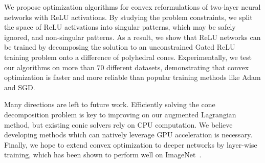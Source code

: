 
We propose optimization algorithms for convex reformulations of two-layer neural networks with ReLU activations.
By studying the problem constraints, we split the space of ReLU activations into singular patterns, which may be safely ignored, and non-singular patterns.
As a result, we show that ReLU networks can be trained by decomposing the solution to an unconstrained Gated ReLU training problem onto a difference of polyhedral cones.
Experimentally, we test our algorithms on more than \( 70 \) different datasets, demonstrating that convex optimization is faster and more reliable than popular training methods like Adam and SGD.

Many directions are left to future work.
Efficiently solving the cone decomposition problem is key to improving on our augmented Lagrangian method, but existing conic solvers rely on CPU computation.
We believe developing methods which can natively leverage GPU acceleration is necessary.
Finally, we hope to extend convex optimization to deeper networks by layer-wise training, which has been shown to perform well on ImageNet~\cite{belilovsky2019greedy}.
